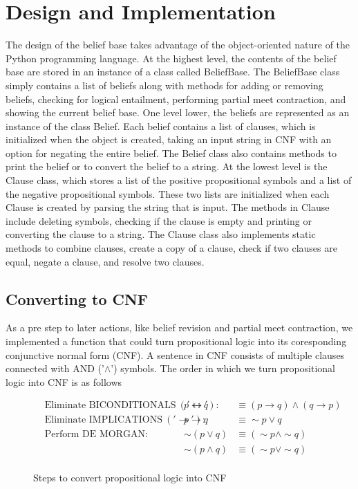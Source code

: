 \documentclass[a4paper,10pt]{article}
\begin{document}
\section{Design and Implementation}
\label{sec:design}
The design of the belief base takes advantage of the object-oriented nature of the Python programming language. At the highest level, the contents of the belief base are stored in an instance of a class called BeliefBase. The BeliefBase class simply contains a list of beliefs along with methods for adding or removing beliefs, checking for logical entailment, performing partial meet contraction, and showing the current belief base. One level lower, the beliefs are represented as an instance of the class Belief. Each belief contains a list of clauses, which is initialized when the object is created, taking an input string in CNF with an option for negating the entire belief. The Belief class also contains methods to print the belief or to convert the belief to a string. At the lowest level is the Clause class, which stores a list of the positive propositional symbols and a list of the negative propositional symbols. These two lists are initialized when each Clause is created by parsing the string that is input. The methods in Clause include deleting symbols, checking if the clause is empty and printing or converting the clause to a string. The Clause class also implements static methods to combine clauses, create a copy of a clause, check if two clauses are equal, negate a clause, and resolve two clauses.

\subsection{Converting to CNF}
\label{subsec:implementation_cnf}
As a pre step to later actions, like belief revision and partial meet contraction, we implemented a function that could turn propositional logic into its coresponding conjunctive normal form (CNF). A sentence in CNF consists of multiple clauses connected with AND ('$\wedge$') symbols. The order in which we turn propositional logic into CNF is as follows

\begin{figure}[h]
	\begin{align*}
		&\text{Eliminate BICONDITIONALS}\ ('\leftrightarrow'): & p\leftrightarrow q &\equiv (p\rightarrow q) \wedge (q\rightarrow p) \\
		&\text{Eliminate IMPLICATIONS}\ ('\rightarrow'): & p\rightarrow q &\equiv \sim p\vee q \\
		&\text{Perform DE MORGAN}: & \sim(p\vee q) &\equiv (\sim p\wedge\sim q) \\
		&						   & \sim(p\wedge q) &\equiv (\sim p\vee\sim q) \\
	\end{align*}
	\caption{Steps to convert propositional logic into CNF}
	\label{fig:cnf_rules}
\end{figure}
\end{document}
